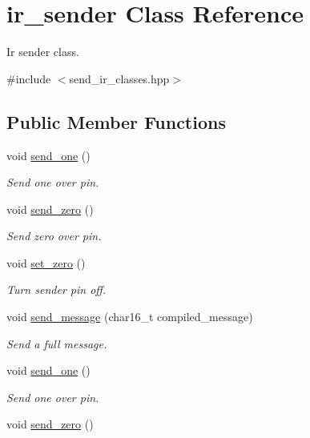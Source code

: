 \hypertarget{classir__sender}{}\section{ir\+\_\+sender Class Reference}
\label{classir__sender}


Ir sender class.  




{\ttfamily \#include $<$send\+\_\+ir\+\_\+classes.\+hpp$>$}

\subsection*{Public Member Functions}
\begin{DoxyCompactItemize}
\item 
void \hyperlink{classir__sender_a53efa5b083ddbbc9f8de912a44135e08}{send\+\_\+one} ()
\begin{DoxyCompactList}\small\item\em Send one over pin. \end{DoxyCompactList}\item 
void \hyperlink{classir__sender_a3868a2512035b0f6b5b6df093db22fbb}{send\+\_\+zero} ()
\begin{DoxyCompactList}\small\item\em Send zero over pin. \end{DoxyCompactList}\item 
void \hyperlink{classir__sender_aa38f450682d96d47347dceefb7167976}{set\+\_\+zero} ()
\begin{DoxyCompactList}\small\item\em Turn sender pin off. \end{DoxyCompactList}\item 
void \hyperlink{classir__sender_a6b23d2e93be4f000ca689395613ea487}{send\+\_\+message} (char16\+\_\+t compiled\+\_\+message)
\begin{DoxyCompactList}\small\item\em Send a full message. \end{DoxyCompactList}\item 
void \hyperlink{classir__sender_a53efa5b083ddbbc9f8de912a44135e08}{send\+\_\+one} ()
\begin{DoxyCompactList}\small\item\em Send one over pin. \end{DoxyCompactList}\item 
void \hyperlink{classir__sender_a3868a2512035b0f6b5b6df093db22fbb}{send\+\_\+zero} ()

\end{DoxyCompactItemize}
